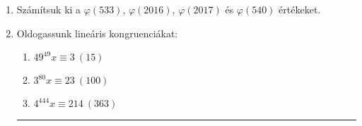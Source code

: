 \documentclass[a4paper, 12pt]{article}
\begin{document}
\begin{enumerate}
            \item Számítsuk ki a $\varphi(533)$, $\varphi(2016)$, $\varphi(2017)$ és $\varphi(540)$ értékeket.

            \item Oldogassunk lineáris kongruenciákat:
            \begin{multicols}{3}			
                \begin{enumerate}
                    \item $49^{49} x \equiv 3 \ (15)$
                    \item $3^{80} x \equiv 23 \ (100)$
                    \item $4^{444} x \equiv 214 \ (363)$
                \end{enumerate}
            \end{multicols}

            \hrule


\end{enumerate}
\end{document}
